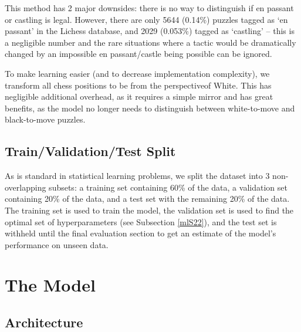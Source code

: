 This method has 2 major downsides: there is no way to distinguish if en passant
or castling is legal. However, there are only 5644 (0.14\%) puzzles tagged as
`en passant' in the Lichess database, and 2029 (0.053\%) tagged as `castling'
-- this is a negligible number and the rare situations where a tactic would be
dramatically changed by an impossible en passant/castle being possible can be
ignored.

To make learning easier (and to decrease implementation complexity), we
transform all chess positions to be from the perspectiveof White. This has
negligible additional overhead, as it requires a simple mirror and has great
benefits, as the model no longer needs to distinguish between white-to-move and
black-to-move puzzles.

\subsection{Train/Validation/Test Split}\label{mlS12}

As is standard in statistical learning problems, we split the dataset into 3
non-overlapping subsets: a training set containing 60\% of the data, a
validation set containing 20\% of the data, and a test set with the remaining
20\% of the data. The training set is used to train the model, the validation
set is used to find the optimal set of hyperparameters (see Subsection
\ref{mlS22}), and the test set is withheld until the final evaluation section
to get an estimate of the model's performance on unseen data.


\section{The Model}\label{mlS2}

\subsection{Architecture}\label{mlS21}

